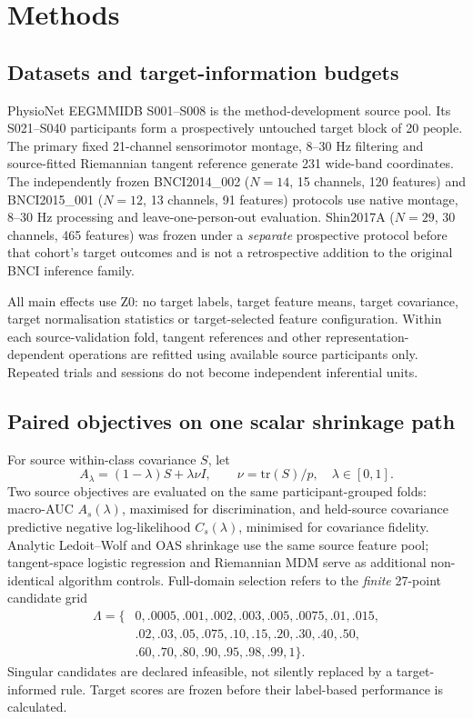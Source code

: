 \documentclass[11pt,a4paper]{article}
\begin{document}


\section{Methods}
\subsection{Datasets and target-information budgets}
PhysioNet EEGMMIDB S001--S008 is the method-development source pool.
Its S021--S040 participants form a prospectively untouched target block
of 20 people. The primary fixed 21-channel sensorimotor montage, 8--30 Hz
filtering and source-fitted Riemannian tangent reference generate 231
wide-band coordinates. The independently frozen BNCI2014\_002
(\(N=14\), 15 channels, 120 features) and BNCI2015\_001
(\(N=12\), 13 channels, 91 features) protocols use native montage,
8--30 Hz processing and leave-one-person-out evaluation. Shin2017A
(\(N=29\), 30 channels, 465 features) was frozen under a \emph{separate}
prospective protocol before that cohort's target outcomes and is not a
retrospective addition to the original BNCI inference family.

All main effects use Z0: no target labels, target feature means, target
covariance, target normalisation statistics or target-selected feature
configuration. Within each source-validation fold, tangent references and
other representation-dependent operations are refitted using available
source participants only. Repeated trials and sessions do not become
independent inferential units.

\subsection{Paired objectives on one scalar shrinkage path}
For source within-class covariance \(S\), let
\[
 A_\lambda=(1-\lambda)S+\lambda\nu I,\qquad
 \nu=\mathrm{tr}(S)/p,\quad \lambda\in[0,1].
\]
Two source objectives are evaluated on the same participant-grouped folds:
macro-AUC \(A_s(\lambda)\), maximised for discrimination, and held-source
covariance predictive negative log-likelihood \(C_s(\lambda)\), minimised for
covariance fidelity. Analytic Ledoit--Wolf and OAS shrinkage use the same
source feature pool; tangent-space logistic regression and Riemannian
MDM serve as additional non-identical algorithm controls. Full-domain
selection refers to the \emph{finite} 27-point candidate grid
\[
\begin{aligned}
\Lambda=\{&0,.0005,.001,.002,.003,.005,.0075,.01,.015,\\
&.02,.03,.05,.075,.10,.15,.20,.30,.40,.50,\\
&.60,.70,.80,.90,.95,.98,.99,1\}.
\end{aligned}
\]
Singular candidates are declared infeasible, not silently replaced by
a target-informed rule. Target scores are frozen before their
label-based performance is calculated.
\end{document}

